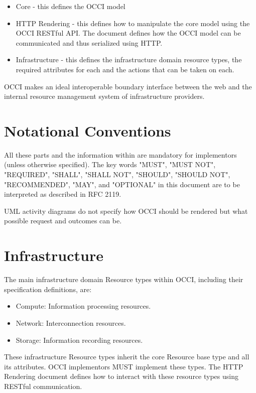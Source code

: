 \documentclass[10pt,a4paper]{article}
\begin{document}
\begin{itemize}
\item Core - this defines the OCCI model
\item HTTP Rendering - this defines how to manipulate the core model using the OCCI RESTful API. The document defines how the OCCI model can be communicated and thus serialized using HTTP.
\item Infrastructure - this defines the infrastructure domain resource types, the required attributes for each and the actions that can be taken on each.
\end{itemize}

OCCI makes an ideal interoperable boundary interface between the web and the internal resource management system of infrastructure providers.

\section{Notational Conventions}

All these parts and the information within are mandatory for implementors (unless otherwise specified). The key words "MUST", "MUST NOT", "REQUIRED", "SHALL", "SHALL NOT", "SHOULD", "SHOULD NOT", "RECOMMENDED", "MAY", and "OPTIONAL" in this document are to be interpreted as described in RFC 2119. 

UML activity diagrams do not specify how OCCI should be rendered but what possible request and outcomes can be.


\section{Infrastructure}

The main infrastructure domain Resource types within OCCI, including their specification definitions, are:
\begin{itemize}
\item Compute: Information processing resources.
\item Network: Interconnection resources.
\item Storage: Information recording resources.
\end{itemize}
These infrastructure Resource types inherit the core Resource base type and all its attributes. OCCI implementors MUST implement these types. The HTTP Rendering document defines how to interact with these resource types using RESTful communication.
\end{document}
